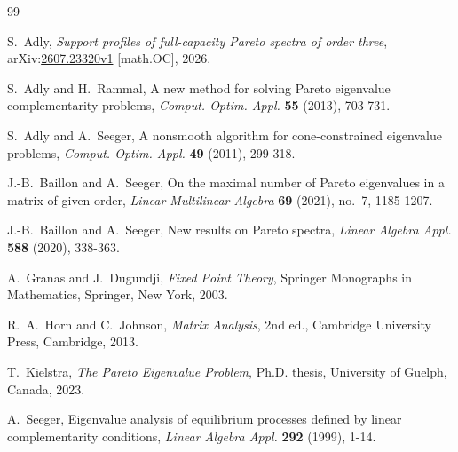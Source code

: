 \documentclass[11pt,a4paper]{article}
\theoremstyle{definition}
\begin{document}
\begin{thebibliography}{99}
\footnotesize
\setlength{\itemsep}{0pt}
\setlength{\parsep}{0pt}

S.~Adly,
\emph{Support profiles of full-capacity Pareto spectra of order three},
arXiv:\allowbreak\href{https://arxiv.org/abs/2607.23320}
{2607.23320v1} [math.OC], 2026.

S.~Adly and H.~Rammal,
A new method for solving Pareto eigenvalue complementarity problems,
\emph{Comput. Optim. Appl.} \textbf{55} (2013), 703-731.

S.~Adly and A.~Seeger,
A nonsmooth algorithm for cone-constrained eigenvalue problems,
\emph{Comput. Optim. Appl.} \textbf{49} (2011), 299-318.

J.-B.~Baillon and A.~Seeger,
On the maximal number of Pareto eigenvalues in a matrix of given order,
\emph{Linear Multilinear Algebra} \textbf{69} (2021), no.~7,
1185-1207.

J.-B.~Baillon and A.~Seeger,
New results on Pareto spectra,
\emph{Linear Algebra Appl.} \textbf{588} (2020), 338-363.

A.~Granas and J.~Dugundji,
\emph{Fixed Point Theory},
Springer Monographs in Mathematics, Springer, New York, 2003.

R.~A.~Horn and C.~Johnson,
\emph{Matrix Analysis}, 2nd ed.,
Cambridge University Press, Cambridge, 2013.

T.~Kielstra,
\emph{The Pareto Eigenvalue Problem},
Ph.D. thesis, University of Guelph, Canada, 2023.

A.~Seeger,
Eigenvalue analysis of equilibrium processes defined by linear
complementarity conditions,
\emph{Linear Algebra Appl.} \textbf{292} (1999), 1-14.

\end{thebibliography}
\end{document}
